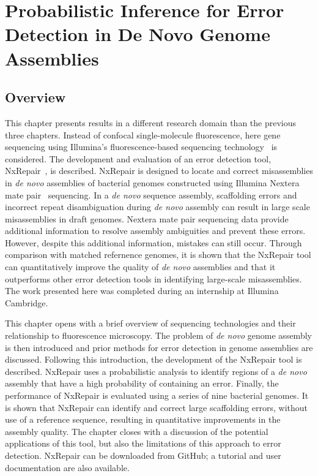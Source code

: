 \chapter{Probabilistic Inference for Error Detection in De Novo Genome Assemblies}
\label{chap:illumina}
\section{Overview}
This chapter presents results in a different research domain than the previous three chapters. Instead of confocal single-molecule  fluorescence, here gene sequencing using Illumina's fluorescence-based sequencing technology~\cite{bentley2008} is considered. The development and evaluation of an error detection tool, NxRepair~\cite{murphy2015}, is described. NxRepair is designed to locate and correct misassemblies in \textit{de novo} assemblies of bacterial genomes constructed using Illumina Nextera mate pair~\cite{nextera2012} sequencing. In a \textit{de novo} sequence assembly, scaffolding errors and incorrect repeat disambiguation during \textit{de novo} assembly can result in large scale misassemblies in draft genomes. Nextera mate pair sequencing data provide additional information to resolve assembly ambiguities and prevent these errors. However, despite this additional information, mistakes can still occur. Through comparison with matched refernence genomes, it is shown that the NxRepair tool can quantitatively improve the quality of \textit{de novo} assemblies and that it outperforms other error detection tools in identifying large-scale misassemblies. The work presented here was completed during an internship at Illumina Cambridge.

This chapter opens with a brief overview of sequencing technologies and their relationship to fluorescence microscopy. The problem of \textit{de novo} genome assembly is then introduced and prior methods for error detection in genome assemblies are discussed. Following this introduction, the development of the NxRepair tool is described. NxRepair uses a probabilistic analysis to identify regions of a \textit{de novo} assembly that have a high probability of containing an error. Finally, the performance of NxRepair is evaluated using a series of nine bacterial genomes. It is shown that NxRepair can identify and correct large scaffolding errors, without use of a reference sequence, resulting in quantitative improvements in the assembly quality. The chapter closes with a discussion of the potential applications of this tool, but also the limitations of this approach to error detection. NxRepair can be downloaded from GitHub; a tutorial and user documentation are also available.
 

